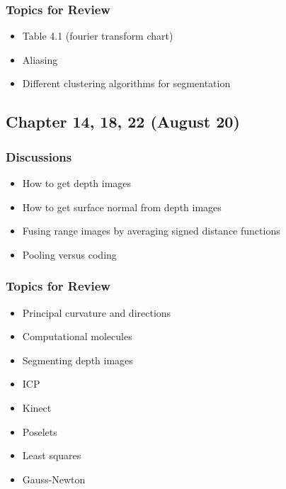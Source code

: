 \subsubsection*{Topics for Review}
\begin{itemize}
\item Table 4.1 (fourier transform chart)
\item Aliasing
\item Different clustering algorithms for segmentation
\end{itemize}

\subsection{Chapter 14, 18, 22 (August 20)}

\subsubsection*{Discussions}
\begin{itemize}
\item How to get depth images
\item How to get surface normal from depth images
\item Fusing range images by averaging signed distance functions
\item Pooling versus coding
\end{itemize}

\subsubsection*{Topics for Review}
\begin{itemize}
\item Principal curvature and directions
\item Computational molecules
\item Segmenting depth images
\item ICP
\item Kinect
\item Poselets
\item Least squares
\item Gauss-Newton
\end{itemize}

